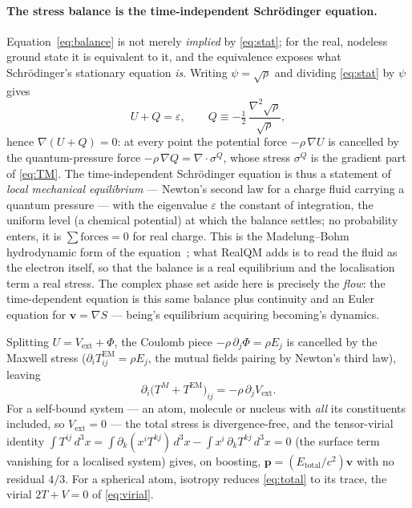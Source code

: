 \documentclass[11pt]{article}
\begin{document}
\paragraph{The stress balance is the time-independent Schr\"odinger equation.}
Equation~\eqref{eq:balance} is not merely \emph{implied} by \eqref{eq:stat}; for the real, nodeless ground state
it is equivalent to it, and the equivalence exposes what Schr\"odinger's stationary equation \emph{is}. Writing
$\psi=\sqrt\rho$ and dividing \eqref{eq:stat} by $\psi$ gives
\begin{equation}
U + Q = \varepsilon,\qquad Q \equiv -\tfrac12\,\frac{\nabla^2\sqrt\rho}{\sqrt\rho},
\label{eq:madelung}
\end{equation}
hence $\nabla(U+Q)=0$: at every point the potential force $-\rho\,\nabla U$ is cancelled by the quantum-pressure
force $-\rho\,\nabla Q=\nabla\!\cdot\sigma^{Q}$, whose stress $\sigma^{Q}$ is the gradient part of \eqref{eq:TM}.
The time-independent Schr\"odinger equation is thus a statement of \emph{local mechanical equilibrium} --- Newton's
second law for a charge fluid carrying a quantum pressure --- with the eigenvalue $\varepsilon$ the constant of
integration, the uniform level (a chemical potential) at which the balance settles; no probability enters, it is
$\textstyle\sum\text{forces}=0$ for real charge. This is the Madelung--Bohm hydrodynamic form of the
equation~\cite{Madelung,Bohm}; what RealQM adds is to read the fluid as the electron itself, so that the balance is
a real equilibrium and the localisation term a real stress. The complex phase set aside here is precisely the
\emph{flow}: the time-dependent equation is this same balance plus continuity and an Euler equation for
$\mathbf v=\nabla S$ --- being's equilibrium acquiring becoming's dynamics.

Splitting $U=V_{\text{ext}}+\Phi$, the Coulomb piece $-\rho\,\partial_j\Phi=\rho E_j$ is cancelled by the Maxwell
stress ($\partial_i T^{\mathrm{EM}}_{ij}=\rho E_j$, the mutual fields pairing by Newton's third law), leaving
\begin{equation}
\partial_i\big(T^{M}+T^{\mathrm{EM}}\big)_{ij} = -\rho\,\partial_j V_{\text{ext}}.
\label{eq:total}
\end{equation}
For a self-bound system --- an atom, molecule or nucleus with \emph{all} its constituents included, so
$V_{\text{ext}}=0$ --- the total stress is divergence-free, and the tensor-virial identity
$\int T^{ij}\,d^3x=\int\partial_k(x^i T^{kj})\,d^3x-\int x^i\,\partial_k T^{kj}\,d^3x=0$ (the surface term vanishing
for a localised system) gives, on boosting, $\mathbf p=(E_{\text{total}}/c^2)\mathbf v$ with no residual $4/3$.
For a spherical atom, isotropy reduces \eqref{eq:total} to its trace, the virial $2T+V=0$ of \eqref{eq:virial}.
\end{document}
